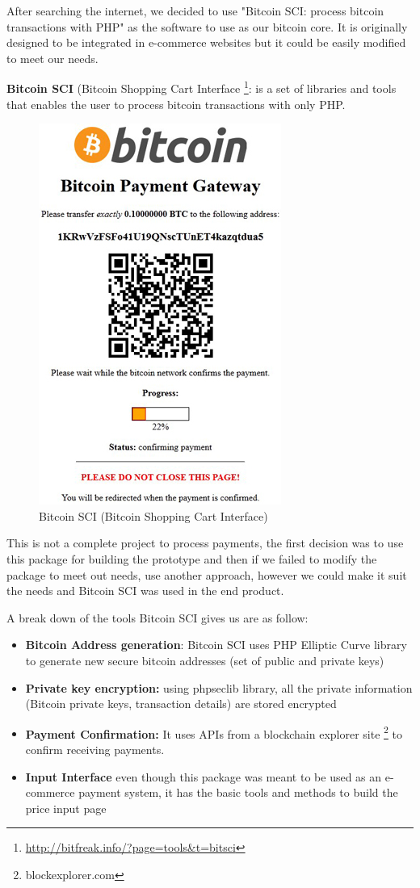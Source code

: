 After searching the internet, we decided to use "Bitcoin SCI: process bitcoin transactions with PHP" as the software to use as our bitcoin core. It is originally designed to be integrated in e-commerce websites but it could be easily modified to meet our needs. 


\textbf{Bitcoin SCI } (Bitcoin Shopping Cart Interface \footnote{\url{http://bitfreak.info/?page=tools&t=bitsci}}: is a set of libraries and tools that enables the user to process bitcoin transactions with only PHP. 

\begin{figure}[htb!p]
\centering
\includegraphics[scale=0.5]{fig/bitsci_screen.jpg}
  \caption{Bitcoin SCI (Bitcoin Shopping Cart Interface)}
\label{fig:bitcoin-sci}
\end{figure}


This is not a complete project to process payments, the first decision was to use this package for building the prototype and then if we failed to modify the package to meet out needs, use another approach, however we could make it suit the needs and Bitcoin SCI was used in the end product. 

A break down of the tools Bitcoin SCI gives us are as follow:
\begin{itemize}
\item \textbf{Bitcoin Address generation}:  Bitcoin SCI uses PHP Elliptic Curve library to generate new secure bitcoin addresses (set of public and private keys)
\item \textbf{Private key encryption: } using phpseclib library, all the private information (Bitcoin private keys, transaction details) are stored encrypted
\item \textbf{Payment Confirmation: } It uses APIs from a blockchain explorer site \footnote{blockexplorer.com} to confirm receiving payments.
\item \textbf{Input Interface} even though this package was meant to be used as an e-commerce payment system, it has the basic tools and methods to build the price input page
\end{itemize}

